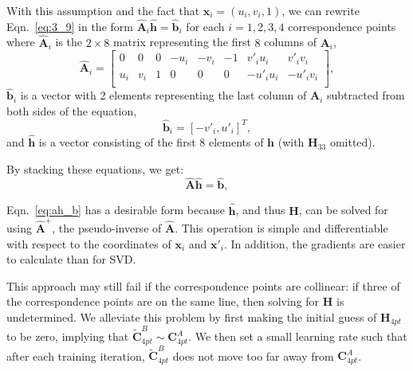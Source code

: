 \documentclass[letterpaper, 10 pt, conference]{ieeeconf}
\newcommand{\bx}{\mathbf{x}}
\begin{document}
With this assumption and the fact that $\mathbf{x}_{i}=(u_{i}, v_{i}, 1)$, we can rewrite Eqn.~\eqref{eq:3_9} in the form $\mathbf{\hat{A}}_i \mathbf{\hat{h}} = \mathbf{\hat{b}}_{i}$ for each $i=1,2,3,4$ correspondence points where $\mathbf{\hat{A}}_{i}$ is the $2 \times 8$ matrix representing the first $8$ columns of $\mathbf{A}_{i}$,
\begin{equation}
               \mathbf{\hat{A}}_{i} = \begin{bmatrix}
         0 & 0 & 0  &  -u_i & -v_i & -1 & v'_i u_i & v'_i v_i\\ 
               u_i & v_i & 1 & 0 & 0 & 0 & -u'_i u_i & -u'_i v_i\\        
           \end{bmatrix}, \nonumber 
\label{eq:gen_Ai}
\end{equation}  
$\mathbf{\hat{b}}_{i}$ is a vector with 2 elements representing the last column of $\mathbf{A}_{i}$ subtracted from both sides of the equation, 
\begin{equation}
   \mathbf{\hat{b}}_{i} = [-v'_i, u'_i]^T
   \nonumber,
 \label{eq:gen_bi}
\end{equation}  
and $\mathbf{\hat{h}}$ is a vector consisting of the first 8 elements of $\mathbf{h}$ (with $\mathbf{H}_{33}$ omitted).

By stacking these equations, we get:
\begin{equation}
\mathbf{\hat{A}} \mathbf{\hat{h}} = \mathbf{\hat{b}},
\label{eq:ah_b}
\end{equation}
 

Eqn.~\eqref{eq:ah_b} has a desirable form because $\mathbf{\hat{h}}$, and thus $\mathbf{H}$, can be solved for using $\mathbf{\hat{A}}^{+}$, the pseudo-inverse of $\mathbf{\hat{A}}$.  This operation is simple and differentiable with respect to the coordinates of $\bx_i$ and $\bx'_i$. In addition, the gradients are easier to calculate than for SVD.

This approach may still fail if the correspondence points are collinear: if three of the correspondence points are on the same line, then solving for $\mathbf{H}$ is undetermined. We alleviate this problem by first making the initial guess of $\mathbf{H}_{4pt}$ to be zero, implying that $\mathbf{\tilde{C}}^{B}_{4pt} \sim \mathbf{C}^A_{4pt}$. We then set a small learning rate such that after each training iteration, $\mathbf{\tilde{C}}^{B}_{4pt}$ does not move too far away from  $\mathbf{C}^A_{4pt}$.
\end{document}
